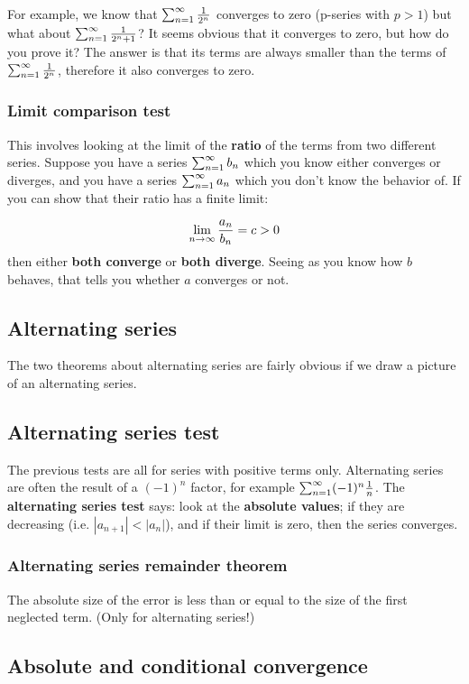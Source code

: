 For example, we know that $\sum_{n=1}^{\infty}\frac{1}{2^n}$ converges to zero (p-series with $p > 1$) but what about $\sum_{n=1}^{\infty}\frac{1}{2^n + 1}$? It seems obvious that it converges to zero, but how do you prove it? The answer is that its terms are always smaller than the terms of $\sum_{n=1}^{\infty}\frac{1}{2^n}$, therefore it also converges to zero.


\subsubsection{Limit comparison test}
This involves looking at the limit of the \textbf{ratio} of the terms from two different series. Suppose you have a series $\sum_{n=1}^{\infty} b_n$ which you know either converges or diverges, and you have a series $\sum_{n=1}^{\infty} a_n$ which you don't know the behavior of. If you can show that their ratio has a finite limit:

$$
\lim\limits_{n \to \infty} \frac{a_n}{b_n} = c > 0
$$
then either \textbf{both converge} or \textbf{both diverge}. Seeing as you know how $b$ behaves, that tells you whether $a$ converges or not.


\subsection{Alternating series}
The two theorems about alternating series are fairly obvious if we draw a picture of an alternating series.

\subsection{Alternating series test}
The previous tests are all for series with positive terms only. Alternating series are often the result of a $(-1)^n$ factor, for example $\sum_{n=1}^{\infty} (-1)^n \frac{1}{n}$. The \textbf{alternating series test} says: look at the \textbf{absolute values}; if they are decreasing (i.e. $|a_{n+1}| < |a_n|$), and if their limit is zero, then the series converges.


\subsubsection{Alternating series remainder theorem}
The absolute size of the error is less than or equal to the size of the first neglected term. (Only for alternating series!)


\subsection{Absolute and conditional convergence}

